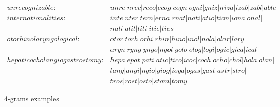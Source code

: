         \begin{figure}
            \begin{align*}
                unrecognizable : &unre \vert nrec \vert reco \vert ecog \vert cogn \vert ogni \vert gniz \vert niza \vert izab \vert zabl \vert able\\
                internationalities : &inte \vert nter \vert tern \vert erna \vert rnat \vert nati \vert atio \vert tion \vert iona \vert onal \vert \\
                &nali \vert alit \vert liti \vert itie \vert ties\\
                otorhinolaryngological : &otor \vert torh \vert orhi \vert rhin \vert hino \vert inol \vert nola \vert olar \vert lary \vert \\
                &aryn \vert ryng \vert yngo \vert ngol \vert golo \vert olog \vert logi \vert ogic \vert gica \vert ical\\
                hepaticocholangiogastrostomy : &hepa \vert epat \vert pati \vert atic \vert tico \vert icoc \vert coch \vert ocho \vert chol \vert hola \vert olan \vert\\
                &lang \vert angi \vert ngio \vert giog \vert ioga \vert ogas \vert gast \vert astr \vert stro \vert\\
                &tros \vert rost \vert osto \vert stom \vert tomy
            \end{align*}
            \caption{4-grams examples}
            \label{fig:4grams}
        \end{figure}

